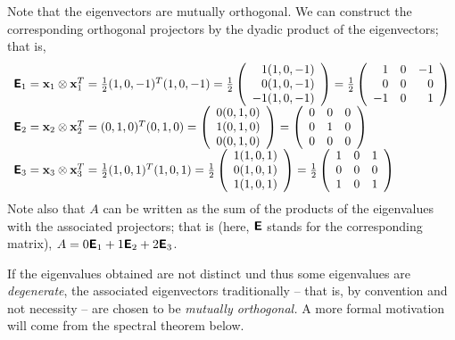 {Note that the eigenvectors are mutually orthogonal.
We can construct the corresponding orthogonal projectors by the dyadic product
of the eigenvectors; that is,
\begin{equation}
\begin{array}{l}
\textsf{\textbf{E}}_1 =
{\bf x}_1 \otimes {\bf x}_1^T =
\frac{1}{2} (1,0,-1)^T(1,0,-1) =
\frac{1}{2}
\left(
\begin{array}{rrrr}
1(1,0,-1)\\
0(1,0,-1)\\
-1(1,0,-1)
\end{array}
\right) =
\frac{1}{2}
\left(
\begin{array}{rrrr}
1&0&-1\\
0&0&0\\
-1&0&1
\end{array}
\right)
\\
\textsf{\textbf{E}}_{2} =
{\bf x}_{2} \otimes {\bf x}_{2}^T =
 (0,1,0)^T(0,1,0) =
\left(
\begin{array}{rrrr}
0(0,1,0)\\
1(0,1,0)\\
0(0,1,0)
\end{array}
\right) =
\left(
\begin{array}{rrrr}
0&0&0\\
0&1&0\\
0&0&0
\end{array}
\right)
\\
\textsf{\textbf{E}}_{3} =
{\bf x}_{3} \otimes {\bf x}_{3}^T =
\frac{1}{2} (1,0,1)^T(1,0,1) =
\frac{1}{2}
\left(
\begin{array}{rrrr}
1(1,0,1)\\
0(1,0,1)\\
1(1,0,1)
\end{array}
\right) =
\frac{1}{2}
\left(
\begin{array}{rrrr}
1&0&1\\
0&0&0\\
1&0&1
\end{array}
\right)
\end{array}
\end{equation}
Note also that $A$ can be written as the sum of the products of the
eigenvalues with the associated projectors; that is (here, $\textsf{\textbf{E}}$
stands for the corresponding matrix),
$A= 0  \textsf{\textbf{E}}_1 + 1  \textsf{\textbf{E}}_{2} +2\textsf{\textbf{E}}_{3} $.
{\textrm{\eexample}}
}

If the eigenvalues obtained are not distinct und thus some eigenvalues are {\em degenerate},
the associated eigenvectors traditionally -- that is, by convention and not necessity -- are chosen to be
{\em mutually orthogonal.}
A more formal motivation will come from the spectral theorem below.


